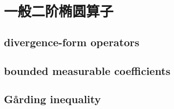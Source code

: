 \section{一般二阶椭圆算子}
\label{b2:sec:1504}


\subsection{divergence-form operators}
\label{b2:subsec:150401}

\subsection{bounded measurable coefficients}
\label{b2:subsec:150402}

\subsection{Gårding inequality}
\label{b2:subsec:150403}



